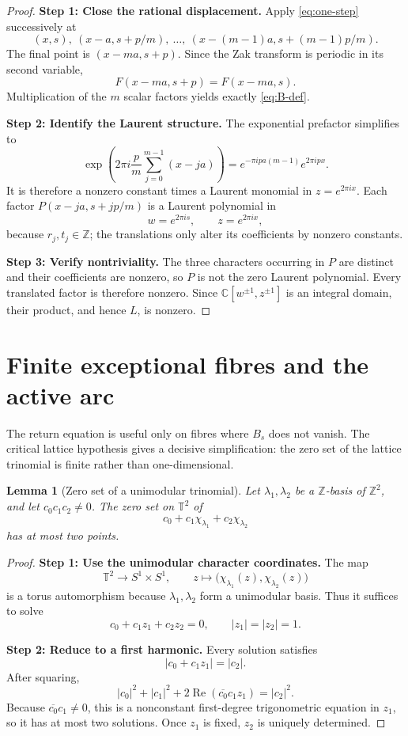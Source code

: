 \documentclass[reqno]{amsart}
\newtheorem{lemma}[theorem]{Lemma}
\theoremstyle{remark}
\numberwithin{equation}{section}
\newcommand{\Z}{\mathbb{Z}}
\newcommand{\T}{\mathbb{T}}
\newcommand{\C}{\mathbb{C}}
\begin{document}
\begin{proof}
\textbf{Step 1: Close the rational displacement.}
Apply \eqref{eq:one-step} successively at
\[
  (x,s),\ (x-a,s+p/m),\ \ldots,\
  (x-(m-1)a,s+(m-1)p/m).
\]
The final point is \((x-ma,s+p)\). Since the Zak transform is periodic in its
second variable,
\[
  F(x-ma,s+p)=F(x-ma,s).
\]
Multiplication of the \(m\) scalar factors yields exactly
\eqref{eq:B-def}.

\smallskip
\noindent
\textbf{Step 2: Identify the Laurent structure.}
The exponential prefactor simplifies to
\[
  \exp\left(
    2\pi i\frac{p}{m}\sum_{j=0}^{m-1}(x-ja)
  \right)
  =e^{-\pi i p a(m-1)}e^{2\pi i p x}.
\]
It is therefore a nonzero constant times a Laurent monomial in
\(z=e^{2\pi i x}\). Each factor
\(P(x-ja,s+jp/m)\) is a Laurent polynomial in
\[
  w=e^{2\pi i s},\qquad z=e^{2\pi i x},
\]
because \(r_j,t_j\in\Z\); the translations only alter its coefficients by
nonzero constants.

\smallskip
\noindent
\textbf{Step 3: Verify nontriviality.}
The three characters occurring in \(P\) are distinct and their coefficients
are nonzero, so \(P\) is not the zero Laurent polynomial. Every translated
factor is therefore nonzero. Since
\(\C[w^{\pm1},z^{\pm1}]\) is an integral domain, their product, and hence
\(L\), is nonzero.
\end{proof}

\section{Finite exceptional fibres and the active arc}
\label{sec:active}

The return equation is useful only on fibres where \(B_s\) does not vanish.
The critical lattice hypothesis gives a decisive simplification: the zero set
of the lattice trinomial is finite rather than one-dimensional.

\begin{lemma}[Zero set of a unimodular trinomial]
\label{lem:trinomial-zeros}
Let \(\lambda_1,\lambda_2\) be a \(\Z\)-basis of \(\Z^2\), and let
\(c_0c_1c_2\neq0\). The zero set on \(\T^2\) of
\[
  c_0+c_1\chi_{\lambda_1}+c_2\chi_{\lambda_2}
\]
has at most two points.
\end{lemma}

\begin{proof}
\textbf{Step 1: Use the unimodular character coordinates.}
The map
\[
  \T^2\longrightarrow S^1\times S^1,
  \qquad
  z\longmapsto
  \bigl(\chi_{\lambda_1}(z),\chi_{\lambda_2}(z)\bigr)
\]
is a torus automorphism because \(\lambda_1,\lambda_2\) form a unimodular
basis. Thus it suffices to solve
\[
  c_0+c_1z_1+c_2z_2=0,
  \qquad |z_1|=|z_2|=1.
\]

\smallskip
\noindent
\textbf{Step 2: Reduce to a first harmonic.}
Every solution satisfies
\[
  |c_0+c_1z_1|=|c_2|.
\]
After squaring,
\[
  |c_0|^2+|c_1|^2
  +2\operatorname{Re}(\overline{c_0}c_1z_1)
  =|c_2|^2.
\]
Because \(\overline{c_0}c_1\neq0\), this is a nonconstant first-degree
trigonometric equation in \(z_1\), so it has at most two solutions. Once
\(z_1\) is fixed, \(z_2\) is uniquely determined.
\end{proof}
\end{document}
